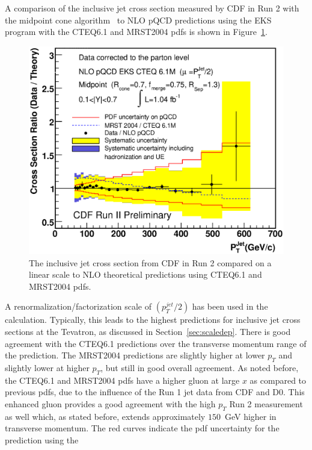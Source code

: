 \documentclass[12pt]{iopart}
\begin{document}
A comparison of the inclusive jet  cross section measured by CDF in Run 2 with the midpoint cone algorithm~\cite{Abulencia:2005yg}  to
NLO pQCD predictions using the EKS~\cite{Ellis:1990ek} program  with the CTEQ6.1 and MRST2004 pdfs is shown in
Figure~\ref{fig:cdf_jet_lin}.
%
\begin{figure}[t]
\begin{center}
\includegraphics[width=12cm]{bless_Ratio_pQCD_final.eps}
\end{center}
\vspace*{-0.5cm}
\caption{
The inclusive jet cross section from CDF in Run 2 compared on a linear scale to NLO theoretical predictions using CTEQ6.1 and MRST2004
pdfs.
\label{fig:cdf_jet_lin}}
\end{figure}
%
A renormalization/factorization scale of $(p_T^{jet}/2)$ has  been used in the calculation. Typically, this
leads to the highest predictions for inclusive jet cross sections at the Tevatron, as discussed in Section~\ref{sec:scaledep}.
There is good
agreement  with the CTEQ6.1 predictions over the transverse momentum range of the prediction. The MRST2004  predictions are slightly
higher at lower $p_T$ and slightly lower at higher $p_T$, but still in good overall agreement. As noted before, the CTEQ6.1 and
MRST2004 pdfs have a higher gluon at  large $x$ as compared to previous pdfs, due to the  influence of the Run 1 jet data from CDF
and  D0. This enhanced gluon provides a good agreement with the high $p_T$ Run 2 measurement as well which, as stated before, extends
approximately $150$~GeV higher in transverse momentum.  The red curves indicate the pdf uncertainty for the prediction using the
\end{document}
